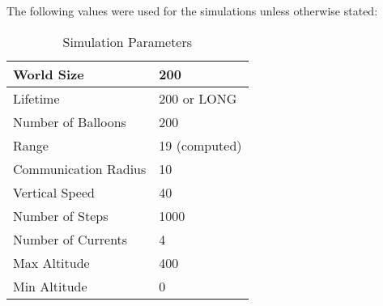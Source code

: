 The following values were used for the simulations unless otherwise stated:

\begin{table}[H]
\centering

\begin{tabular}{l|l}
World Size         & 200     \\ \hline
Lifetime           & 200 or LONG   \\\hline
Number of Balloons & 200 \\\hline
Range & 19 (computed) \\\hline
Communication Radius & 10 \\\hline
Vertical Speed     & 40      \\\hline
Number of Steps    & 1000  \\\hline
Number of Currents & 4       \\\hline
Max Altitude       & 400     \\\hline
Min Altitude       & 0 \hline      
\end{tabular}
\caption{Simulation Parameters}
\label{tbl_modelParameters}
\end{table}

